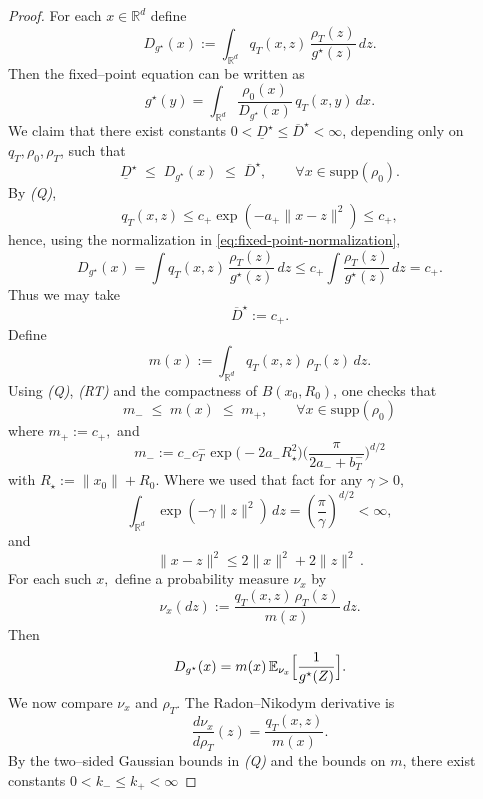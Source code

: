 \documentclass[11pt]{article}
\theoremstyle{remark}
\numberwithin{equation}{section}
\def\amin{a_{-}}
\def\amax{a_{+}}
\def\bmin{b_T^{-}}
\def\cmin{c_{-}}
\def\cmax{c_{+}}
\def\cTmin{c_T^{-}}
\begin{document}
\begin{proof}
For each $x\in\mathbb{R}^d$ define
\[
  D_{g^\star}(x)
  :=
  \int_{\mathbb{R}^d} q_T(x,z)\,\frac{\rho_T(z)}{g^\star(z)}\,dz.
\]
Then the fixed--point equation can be written as
\[
  g^\star(y)
  =
  \int_{\mathbb{R}^d}
    \frac{\rho_0(x)}{D_{g^\star}(x)}\,q_T(x,y)\,dx.
\]
We claim that there exist constants $0<\underline{D}^\star \le\overline{D}^\star<\infty$,
depending only on $q_T,\rho_0,\rho_T$, such that
\begin{equation}\label{eq:Dg-two-sided}
  \underline{D}^\star \;\le\; D_{g^\star}(x) \;\le\; \overline{D}^\star,
  \qquad \forall x\in\mathrm{supp}(\rho_0).
\end{equation}
By \emph{(Q)},
\[
  q_T(x,z) \le \cmax \exp(-\amax \|x-z\|^2) \le \cmax,
\]
hence, using the normalization in \eqref{eq:fixed-point-normalization},
\begin{equation}
\label{D upper boound}
  D_{g^\star}(x)
  =
  \int q_T(x,z)\,\frac{\rho_T(z)}{g^\star(z)}\,dz
  \le
  \cmax \int \frac{\rho_T(z)}{g^\star(z)}\,dz
  =
  \cmax.
\end{equation}
Thus we may take
\begin{equation}
    \label{Dmax def}
  \overline{D}^\star := \cmax.
\end{equation}
Define
\[
  m(x)
  :=
  \int_{\mathbb{R}^d} q_T(x,z)\,\rho_T(z)\,dz.
\]
Using \emph{(Q)}, \emph{(RT)} and the compactness of $B(x_0,R_0)$,
one checks that 
\[
  m_- \;\le\; m(x) \;\le\; m_+, \qquad \forall x\in\mathrm{supp}(\rho_0)
\]
where
\(
  m_+
  :=
  \cmax,
\)
and
\[
  m_-
  :=
  \cmin\cTmin
  \exp\!\big(-2\amin R_\star^2\big)
  \Big(\frac{\pi}{2\amin+\bmin}\Big)^{\!d/2}
\]
with $R_\star:=\|x_0\|+R_0.$ Where we used that fact
for any $\gamma>0,$
\begin{equation}
\label{gauss density formula}
\int_{\mathbb{R}^d}
  \exp(-\gamma\|z\|^2)\,dz
  =
  \left(\frac{\pi}{\gamma}\right)^{d/2}
  <\infty,
\end{equation}
and
\begin{equation}
\label{parallepiped inequaility}
    \|x - z\|^2 \le 2\|x\|^2 + 2\|z\|^2 \, .
\end{equation}
For each such $x,$ define a probability measure $\nu_x$ by
\[
  \nu_x(dz)
  :=
  \frac{q_T(x,z)\,\rho_T(z)}{m(x)}\,dz.
\]
Then
\[
  D_{g^\star}(x)
  =
  m(x)\,\mathbb{E}_{\nu_x}\Bigl[\frac{1}{g^\star(Z)}\Bigr].
\]
We now compare $\nu_x$ and $\rho_T$. The Radon--Nikodym derivative is
\[
  \frac{d\nu_x}{d\rho_T}(z)
  =
  \frac{q_T(x,z)}{m(x)}.
\]
By the two--sided Gaussian bounds in \emph{(Q)} and the bounds on $m$, there exist constants $0<k_-\le k_+<\infty$

\end{proof}
\end{document}

